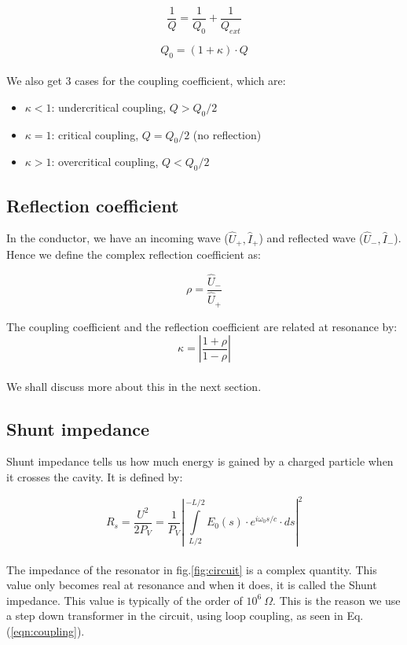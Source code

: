 \documentclass[a4paper]{article}
\numberwithin{equation}{section}
\begin{document}
\[
		\frac{1}{Q} = \frac{1}{Q_{0}} + \frac{1}{Q_{ext}}
\]

\begin{equation} \label{eqn:quality}
		Q_{0} = \left(1 + \kappa\right)\cdot Q
\end{equation}
\\
We also get 3 cases for the coupling coefficient, which are: 
\begin{itemize}
		\item $\kappa < 1$: undercritical coupling, $Q>Q_{0}/2$
		\item $\kappa = 1$: critical coupling, $Q = Q_{0}/2$ (no reflection)
		\item $\kappa > 1$: overcritical coupling, $Q<Q_{0}/2$ 
\end{itemize}

\subsection{Reflection coefficient}
In the conductor, we have an incoming wave ($\hat{U}_{+}, \hat{I}_{+}$) and
reflected wave ($\hat{U}_{-}, \hat{I}_{-}$). Hence we define the complex
reflection coefficient as:

\begin{equation} \label{eqn:refleccoeff}
		\rho = \frac{\hat{U}_{-}}{\hat{U}_{+}}
\end{equation}

The coupling coefficient and the reflection coefficient are related at resonance
by: 
\\
\begin{equation}
		\kappa = \left|\frac{1 + \rho}{1 - \rho} \right| 
\end{equation}
\\
We shall discuss more about this in the next section.

\subsection{Shunt impedance}
Shunt impedance tells us how much energy is gained by a charged particle when it
crosses the cavity. It is defined by: 

\begin{equation}
		R_{s} = \frac{U^2}{2 P_{V}} = \frac{1}{P_{V}} \left|\int\limits_{L/2}^{-L/2} E_{0}\left(s \right) \cdot e^{i \omega_{0}s/c}\cdot ds \right|^2 
\end{equation}
\\
The impedance of the resonator in fig.\ref{fig:circuit} is a complex quantity. This value only becomes real at resonance and when it does, it is called the Shunt impedance. This value is typically of the order of $10^{6} \  \Omega$. This is the reason we use a step down transformer in the circuit, using loop coupling, as seen in Eq.(\ref{eqn:coupling}). 
\end{document}
